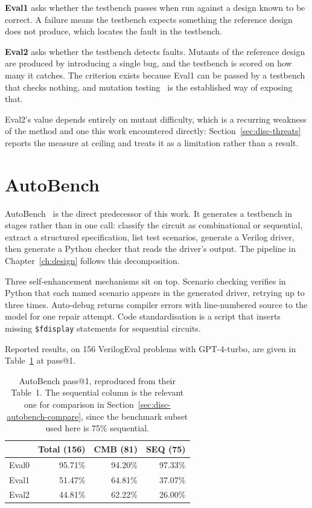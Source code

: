 \documentclass[11pt,a4paper,titlepage=false]{scrreprt}
\begin{document}
\textbf{Eval1} asks whether the testbench passes when run against a design known to be
correct. A failure means the testbench expects something the reference design does not
produce, which locates the fault in the testbench.

\textbf{Eval2} asks whether the testbench detects faults. Mutants of the reference design
are produced by introducing a single bug, and the testbench is scored on how many it
catches. The criterion exists because Eval1 can be passed by a testbench that checks
nothing, and mutation testing~\cite{jia2011mutation} is the established way of exposing
that.

Eval2's value depends entirely on mutant difficulty, which is a recurring weakness of the
method and one this work encountered directly: Section~\ref{sec:disc-threats} reports the
measure at ceiling and treats it as a limitation rather than a result.

\section{AutoBench}\label{sec:bg-autobench}

AutoBench~\cite{qiu2024autobench} is the direct predecessor of this work. It generates a
testbench in stages rather than in one call: classify the circuit as combinational or
sequential, extract a structured specification, list test scenarios, generate a Verilog
driver, then generate a Python checker that reads the driver's output. The pipeline in
Chapter~\ref{ch:design} follows this decomposition.

Three self-enhancement mechanisms sit on top. Scenario checking verifies in Python that each
named scenario appears in the generated driver, retrying up to three times. Auto-debug
returns compiler errors with line-numbered source to the model for one repair attempt. Code
standardisation is a script that inserts missing \texttt{\$fdisplay} statements for
sequential circuits.

Reported results, on 156 VerilogEval problems with GPT-4-turbo, are given in
Table~\ref{tab:autobench-results} at pass@1.

\begin{table}[H]
\centering
\small
\begin{tabular}{@{}l r r r@{}}
\toprule
 & \textbf{Total (156)} & \textbf{CMB (81)} & \textbf{SEQ (75)} \\
\midrule
Eval0 & 95.71\% & 94.20\% & 97.33\% \\
Eval1 & 51.47\% & 64.81\% & 37.07\% \\
Eval2 & 44.81\% & 62.22\% & 26.00\% \\
\bottomrule
\end{tabular}
\caption{AutoBench pass@1, reproduced from their Table~1. The sequential column is the
relevant one for comparison in Section~\ref{sec:disc-autobench-compare}, since the benchmark
subset used here is 75\% sequential.}
\label{tab:autobench-results}
\end{table}
\end{document}
